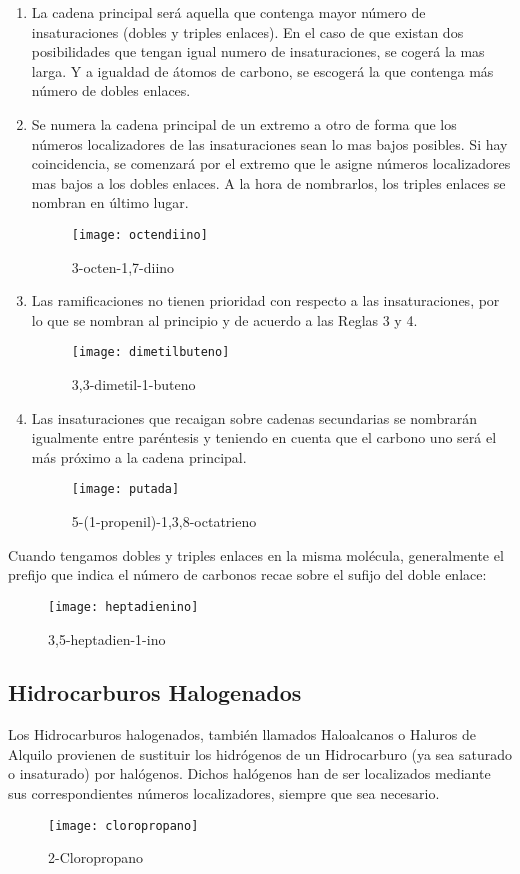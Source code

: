 \begin{enumerate}
	\setcounter{enumi}{\value{nx}}
	\item La cadena principal será aquella que contenga mayor número de insaturaciones (dobles y triples enlaces). En el caso de que existan dos posibilidades que tengan igual numero de insaturaciones, se cogerá la mas larga. Y a igualdad de átomos de carbono, se escogerá la que contenga más número de dobles enlaces.\\
	
	\item Se numera la cadena principal de un extremo a otro de forma que los números localizadores de las insaturaciones sean lo mas bajos posibles. Si hay coincidencia, se comenzará por el extremo que le asigne números localizadores mas bajos a los dobles enlaces. A la hora de nombrarlos, los triples enlaces se nombran en último lugar.
	\begin{figure}[h!]
		\centering
		\texttt{[image: octendiino]}
		\captionsetup{labelformat=empty}
		\caption{3-octen-1,7-diino}
	\end{figure}
	\item Las ramificaciones no tienen prioridad con respecto a las insaturaciones, por lo que se nombran al principio y de acuerdo a las Reglas 3 y 4.
	\begin{figure}[h!]
		\centering
		\texttt{[image: dimetilbuteno]}
		\captionsetup{labelformat=empty}
		\caption{3,3-dimetil-1-buteno}
	\end{figure}
	\item Las insaturaciones que recaigan sobre cadenas secundarias se nombrarán igualmente entre paréntesis y teniendo en cuenta que el carbono uno será el más próximo a la cadena principal.
	\begin{figure}[h!]
		\centering
		\texttt{[image: putada]}
		\captionsetup{labelformat=empty}
		\caption{5-(1-propenil)-1,3,8-octatrieno}
	\end{figure}
\end{enumerate}
Cuando tengamos dobles y triples enlaces en la misma molécula, generalmente el prefijo que indica el número de carbonos recae sobre el sufijo del doble enlace:\\

\begin{figure}[h!]
	\centering
	\texttt{[image: heptadienino]}
	\captionsetup{labelformat=empty}
	\caption{3,5-heptadien-1-ino}
\end{figure}
\subsection{Hidrocarburos Halogenados}
Los Hidrocarburos halogenados, también llamados Haloalcanos o Haluros de Alquilo provienen de sustituir los hidrógenos de un Hidrocarburo (ya sea saturado o insaturado) por halógenos. Dichos halógenos han de ser localizados mediante sus correspondientes números localizadores, siempre que sea necesario.

\begin{figure}[h!]
	\centering
	\texttt{[image: cloropropano]}
	\captionsetup{labelformat=empty}
	\caption{2-Cloropropano}
\end{figure}

